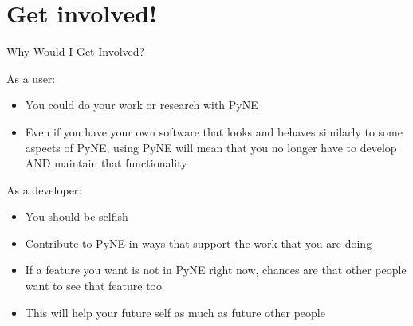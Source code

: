 \documentclass[xcolor=x11names,compress]{beamer}
\begin{document}
\section{Get involved!}
\begin{frame}{Why Would I Get Involved?}

\begin{block}{As a \alert{user}:}
    \begin{itemize}
    \item You could do your work or research with PyNE
    \item Even if you have your own software that looks and behaves similarly to some aspects of PyNE, using PyNE will mean that you no longer have to develop AND maintain that functionality
    \end{itemize}
\end{block}

    \vspace*{1 em}
\begin{block}{As a \alert{developer}:}
    \begin{itemize}
    \item You should be selfish
    \item Contribute to PyNE in ways that support the work that you are doing
    \item If a feature you want is not in PyNE right now, chances are that other
    people want to see that feature too
    \item This will help your future self as much as future other people
    \end{itemize}
\end{block}

\end{frame}
\end{document}
